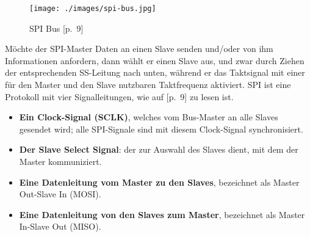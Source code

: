 \begin{figure}[h]
	\begin{center}
		\texttt{[image: ./images/spi-bus.jpg]}
	\end{center}
	\vspace{-5pt}
	\caption[SPI Bus]{SPI Bus \cite{Leens2009}[p.~9]} %
	\label{fig:spi:bus}
	\vspace{-5pt}
\end{figure}
Möchte der SPI-Master Daten an einen Slave senden und/oder von ihm Informationen anfordern, dann wählt er einen Slave aus, und zwar durch Ziehen der entsprechenden SS-Leitung nach unten, während er das Taktsignal mit einer für den Master und den Slave nutzbaren Taktfrequenz aktiviert.
SPI ist eine Protokoll mit vier Signalleitungen, wie auf \cite{Leens2009}[p.~9] zu lesen ist.
\begin{itemize}
	\item \textbf{Ein Clock-Signal (SCLK)}, welches vom Bus-Master an alle Slaves gesendet wird; alle SPI-Signale sind mit diesem Clock-Signal synchronisiert.
	\item \textbf{Der Slave Select Signal}: der zur Auswahl des Slaves dient, mit dem der Master kommuniziert.
	\item \textbf{Eine Datenleitung vom Master zu den Slaves}, bezeichnet als Master Out-Slave In (MOSI).
	\item \textbf{Eine Datenleitung von den Slaves zum Master}, bezeichnet als Master In-Slave Out (MISO).
\end{itemize}
